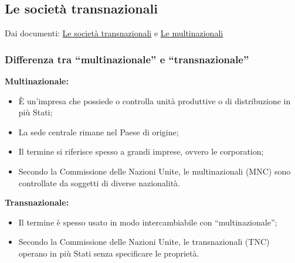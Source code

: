\documentclass{article}
\begin{document}
\subsection{Le società transnazionali}
Dai documenti: \href{https://github.com/matteofrongillo/passerella/blob/main/Geografia/media/031_Pass 06c Transnazionali 23-24 schede.pdf?raw=true}
{Le società transnazionali} e
\href{https://github.com/matteofrongillo/passerella/blob/main/Geografia/media/032_Le multinazionali AtlasEspaceMondial Deepl SoloTesto.pdf?raw=true}
{Le multinazionali}

\subsubsection{Differenza tra ``multinazionale'' e ``transnazionale''}
\textbf{Multinazionale:}
\begin{itemize}
    \item È un'impresa che possiede o controlla unità produttive o di distribuzione in più
        Stati;
    \item La sede centrale rimane nel Paese di origine;
    \item Il termine si riferisce spesso a grandi imprese, ovvero le corporation;
    \item Secondo la Commissione delle Nazioni Unite, le multinazionali (MNC) sono controllate
        da soggetti di diverse nazionalità.
\end{itemize}

\textbf{Transnazionale:}
\begin{itemize}
    \item Il termine è spesso usato in modo intercambiabile con ``multinazionale'';
    \item Secondo la Commissione delle Nazioni Unite, le transnazionali (TNC) operano in più
        Stati senza specificare le proprietà.
\end{itemize}
\end{document}
